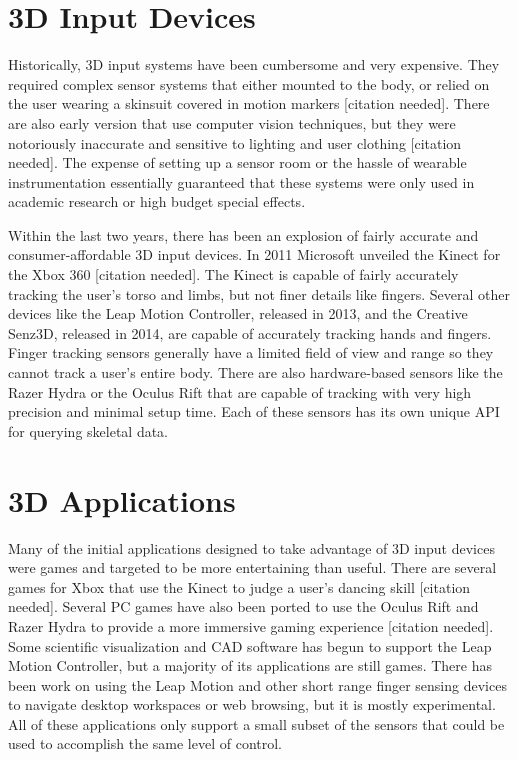 \section{3D Input Devices}

Historically, 3D input systems have been cumbersome and very expensive. They required complex sensor systems that either mounted to the body, or relied on the user wearing a skinsuit covered in motion markers [citation needed]. There are also early version that use computer vision techniques, but they were notoriously inaccurate and sensitive to lighting and user clothing [citation needed]. The expense of setting up a sensor room or the hassle of wearable instrumentation essentially guaranteed that these systems were only used in academic research or high budget special effects.

Within the last two years, there has been an explosion of fairly accurate and consumer-affordable 3D input devices. In 2011 Microsoft unveiled the Kinect for the Xbox 360 [citation needed]. The Kinect is capable of fairly accurately tracking the user’s torso and limbs, but not finer details like fingers. Several other devices like the Leap Motion Controller, released in 2013,  and the Creative Senz3D, released in 2014, are capable of accurately tracking hands and fingers. Finger tracking sensors generally have a limited field of view and range so they cannot track a user’s entire body. There are also hardware-based sensors like the Razer Hydra or the Oculus Rift that are capable of tracking with very high precision and minimal setup time. Each of these sensors has its own unique API for querying skeletal data.

\section{3D Applications}

Many of the initial applications designed to take advantage of 3D input devices were games and targeted to be more entertaining than useful. There are several games for Xbox that use the Kinect to judge a user’s dancing skill [citation needed]. Several PC games have also been ported to use the Oculus Rift and Razer Hydra to provide a more immersive gaming experience [citation needed]. Some scientific visualization and CAD software has begun to support the Leap Motion Controller, but a majority of its applications are still games. There has been work on using the Leap Motion and other short range finger sensing devices to navigate desktop workspaces or web browsing, but it is mostly experimental. All of these applications only support a small subset of the sensors that could be used to accomplish the same level of control.

